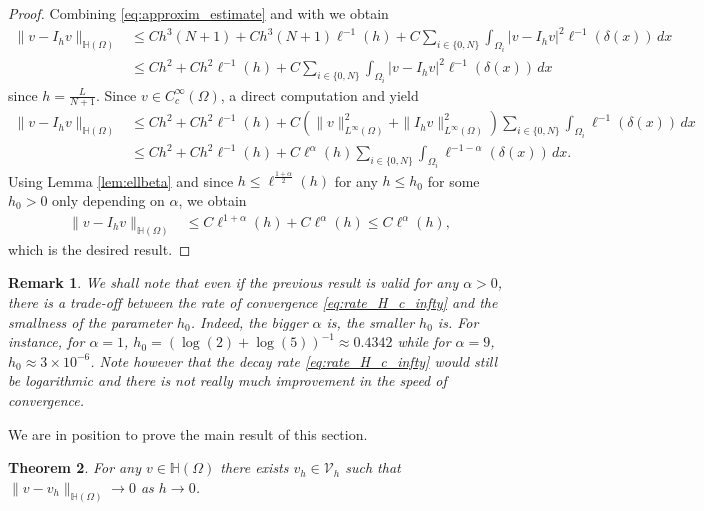 \documentclass[10 pt]{article}
\newtheorem{theorem}{Theorem}[section]
\newtheorem{remark}[theorem]{Remark}
\numberwithin{equation}{section}
\begin{document}
\begin{proof}
Combining \eqref{eq:approxim_estimate} and  with  we obtain
%
\begin{align*}
    \|v-I_h v\|_{\mathbb H(\Omega)}&\leq  C h^3(N+1)+Ch^3(N+1)\ell^{-1}(h)+C\sum_{i\in\{0,N\}}\int_{\Omega_i}|v-I_h v|^2\ell^{-1}(\delta(x))\,dx \\
    &\leq Ch^2+Ch^2\ell^{-1}(h)+C\sum_{i\in\{0,N\}}\int_{\Omega_i}|v-I_h v|^2\ell^{-1}(\delta(x))\,dx
\end{align*}
since $h=\frac{L}{N+1}$. Since $v\in C_c^\infty(\Omega)$, a direct computation and  yield
%
\begin{align*}
    \|v-I_h v\|_{\mathbb H(\Omega)} &\leq Ch^2+Ch^2\ell^{-1}(h)+C\left(\|v\|_{L^\infty(\Omega)}^2+\|I_hv\|^2_{L^\infty(\Omega)}\right)\sum_{i\in\{0,N\}}\int_{\Omega_i}\ell^{-1}(\delta(x))\,dx \\
    & \leq Ch^2+Ch^2\ell^{-1}(h)+C\ell^{\alpha}(h)\sum_{i\in\{0,N\}}\int_{\Omega_i}\ell^{-1-\alpha}(\delta(x))\,dx.
\end{align*}
%
Using Lemma \ref{lem:ellbeta} and since $h\leq \ell^{\frac{1+\alpha}{2}}(h)$ for any $h\leq h_0$ for some $h_0>0$ only depending on $\alpha$, we obtain
%
\begin{align*}
    \|v-I_h v\|_{\mathbb H(\Omega)}
    & \leq C\ell^{1+\alpha}(h)+C\ell^{\alpha}(h)\leq C \ell^{\alpha}(h),
\end{align*}
which is the desired result.
\end{proof}

\begin{remark}
We shall note that even if the previous result is valid for any $\alpha>0$, there is a trade-off between the rate of convergence \eqref{eq:rate_H_c_infty} and the smallness of the parameter $h_0$. Indeed, the bigger $\alpha$ is, the smaller $h_0$ is. For instance, for $\alpha=1$, $h_0=(\log(2)+\log(5))^{-1}\approx 0.4342$ while for $\alpha=9$, $h_0\approx 3\times 10^{-6}$. Note however that the decay rate \eqref{eq:rate_H_c_infty} would still be logarithmic and there is not really much improvement in the speed of convergence.  
\end{remark}

We are in position to prove the main result of this section.

\begin{theorem}\label{density:thm}
    For any $v\in\mathbb H(\Omega)$ there exists $v_h\in\mathcal V_h$ such that $\|v-v_h\|_{\mathbb H(\Omega)}\to 0$ as $h\to 0$. 
\end{theorem}
\end{document}

